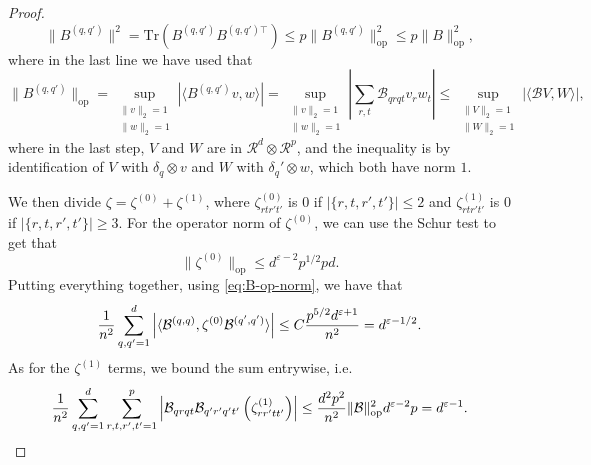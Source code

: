 \documentclass[letterpaper, 10pt, dvipsnames]{article}
\numberwithin{equation}{section}
\newcommand{\B}{\mathcal{B}}
\newcommand{\R}{\mathcal{R}}
\renewcommand{\epsilon}{\varepsilon}
\let\O\relax
\newcommand{\O}[1]{\mathcal{O}\left(#1\right)}
\theoremstyle{definition}
\begin{document}
\begin{proof}
  \begin{equation}\label{eq:B-op-norm}
  \|B^{(q,q')}\|^2= \mathrm{Tr}\left(B^{(q,q')}B^{(q,q')\top}\right) \leq p \|B^{(q,q')}\|_{\mathrm{op}}^2 \leq p \|B\|_{\mathrm{op}}^2,
  \end{equation}
  where in the last line we have used that 
  \[
    \|B^{(q,q')}\|_{\mathrm{op}}
    = \sup_{\substack{\|v\|_2 = 1 \\ \|w\|_2 = 1}} \left| \langle B^{(q,q')}v, w \rangle \right|
    = \sup_{\substack{\|v\|_2 = 1 \\ \|w\|_2 = 1}} \left| \sum_{r,t} \B_{qrqt} v_r w_t \right|
    \leq \sup_{\substack{\|V\|_2 = 1 \\ \|W\|_2 = 1}} \left| \langle \B V, W \rangle \right|,
  \]
  where in the last step, $V$ and $W$ are in $\R^{d} \otimes \R^{p}$, and the inequality is by identification of $V$ with $\delta_q \otimes v$ and $W$ with $\delta_q' \otimes w$, which both have norm $1$.

  
  We then divide $\zeta = \zeta^{(0)} + \zeta^{(1)}$, where $\zeta^{(0)}_{rtr't'}$ is $0$ if $|\{r,t,r',t'\}|\leq 2$ and $\zeta^{(1)}_{rtr't'}$ is $0$ if $|\{r,t,r',t'\}|\geq 3$.  For the operator norm of $\zeta^{(0)}$, we can use the Schur test to get that 
  \[
  \| \zeta^{(0)} \|_{\mathrm{op}} \leq d^{\varepsilon-2} p^{1/2} pd. 
  \]
  Putting everything together, using \eqref{eq:B-op-norm}, we have that 
  \[
    \frac{1}{n^2}
    \sum_{q,q'=1}^d
    \left| \langle \B^{(q,q)}, \zeta^{(0)} \B^{(q',q')} \rangle \right|
    \leq C\frac{p^{5/2} d^{\epsilon+1}}{n^2} = \O{d^{\epsilon-1/2}}.
  \]
  As for the $\zeta^{(1)}$ terms, we bound the sum entrywise, i.e. 
  \[
    \frac{1}{n^2}\sum_{q,q'=1}^d\sum_{r,t,r',t'=1}^p \left|\B_{qrqt}\B_{q'r'q't'}\left( \zeta^{(1)}_{rr'tt'}\right)\right| \leq \frac{d^{2} p^2}{n^2}\|\B\|_{\mathrm{op}}^2 d^{\varepsilon-2}p = \O{{d^{\epsilon-1}}}.
  \]


\end{proof}
\end{document}
